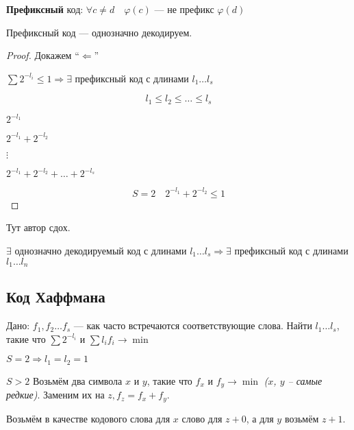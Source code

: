 \begin{definition}
    \textbf{Префиксный} код: $\forall c\not=d \quad \varphi(c)$ --- не префикс $\varphi(d)$
\end{definition}

\begin{lemma}
    Префиксный код --- однозначно декодируем.
\end{lemma}

\begin{proof}
    Докажем ``$\Leftarrow$''

    $\sum 2^{-l_i}\leq 1 \Rightarrow \exists$ префиксный код с длинами $l_1\ldots l_s$

    $$l_1\leq l_2\leq \ldots\leq l_s$$

    $2^{-l_1}$

    $2^{-l_1}+2^{-l_2}$

    $\vdots$

    $2^{-l_1}+2^{-l_2}+\ldots+2^{-l_s}$

    $$S=2 \quad 2^{-l_1}+2^{-l_2}\leq 1$$
\end{proof}

Тут автор сдох.

\begin{corollary}
    $\exists$ однозначно декодируемый код с длинами $l_1\ldots l_s \Rightarrow \exists$ префиксный код с длинами $l_1\ldots l_n$
\end{corollary}

\subsection{Код Хаффмана}

Дано: $f_1,f_2\ldots f_s$ --- как часто встречаются соответствующие слова. Найти $l_1\ldots l_s$, такие что $\sum 2^{-l_i}$ и $\sum l_if_i\to \min$

$S=2\Rightarrow l_1=l_2=1$

$S>2$ Возьмём два символа $x$ и $y$, такие что $f_x$ и $f_y\to\min$ \textit{($x$, $y$ -- самые редкие)}. Заменим их на $z, f_z=f_x+f_y$.

Возьмём в качестве кодового слова для $x$ слово для $z + 0$, а для $y$ возьмём $z + 1$.

